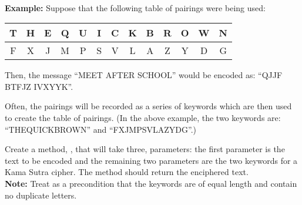 \begin{questions}
    \\[4pt]
    {\small\textbf{Example:} Suppose that the following table of pairings were being used:
      \begin{center}
        \renewcommand\arraystretch{1.5}
        \begin{tabular}{| c | c | c | c | c | c | c | c | c | c | c | c | c |}
          \hline
          T & H & E & Q & U & I & C & K & B & R & O & W & N\\
          \hline
          F & X & J & M & P & S & V & L & A & Z & Y & D & G\\
          \hline
        \end{tabular}
      \end{center}
    Then, the message ``MEET AFTER SCHOOL'' would be encoded as: ``QJJF BTFJZ IVXYYK''.

    Often, the pairings will be recorded as a series of keywords which are then used to create the table of pairings. (In the above example, the two keywords are: ``THEQUICKBROWN'' and ``FXJMPSVLAZYDG''.)}

    Create a method, , that will take three,  parameters: the first parameter is the text to be encoded and the remaining two parameters are the two keywords for a Kama Sutra cipher. The method should return the enciphered text.\\
    {\small\textbf{Note:} Treat as a precondition that the keywords are of equal length and contain no duplicate letters.}
  \end{questions}

